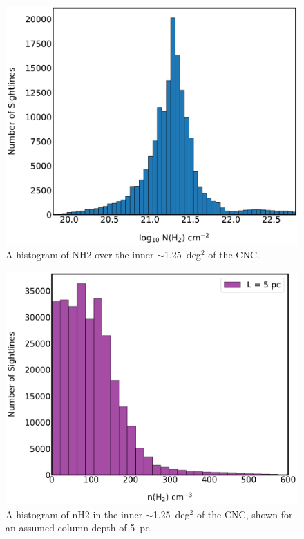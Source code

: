 \begin{figure}[!htbp]
\centering
\includegraphics[width=\textwidth]{figures/carina/NH2_hist_500}
\caption[~A histogram of  over the inner  of the CNC.]{A histogram of \gls{NH2} over the inner $\sim$1.25~deg$^{2}$ of the CNC.}
\label{fig:NH2_hist}
\end{figure}

\begin{figure}[!htbp]
\centering
\includegraphics[width=\textwidth]{figures/carina/nH2_hist_500}
\caption[~A histogram of  in the inner  of the CNC.]{A histogram of \gls{nH2} in the inner $\sim$1.25~deg$^{2}$ of the CNC, shown for an assumed column depth of 5~pc.}
\label{fig:nH2_hist}
\end{figure}

